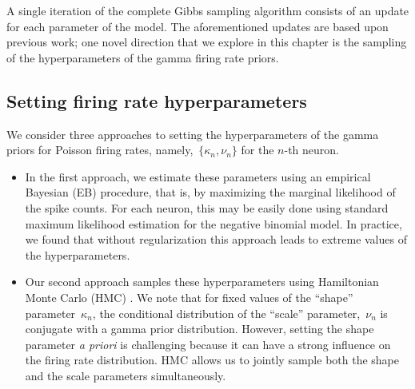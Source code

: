 A single iteration of the complete Gibbs sampling algorithm consists
of an update for each parameter of the model. The aforementioned
updates are based upon previous work; one novel direction that we
explore in this chapter is the sampling of the hyperparameters of the
gamma firing rate priors.

\subsection{Setting firing rate hyperparameters} 
\label{sec:fr_hypers}
We consider three approaches to setting the hyperparameters of the
gamma priors for Poisson firing rates, namely,~${\{\kappa_n,
  \nu_n\}}$ for the $n$-th neuron.  

\begin{itemize}

\item In the first approach, we estimate these parameters using an
  empirical Bayesian (EB) procedure, that is, by maximizing the
  marginal likelihood of the spike counts.  For each neuron, this may be
  easily done using standard maximum likelihood estimation for the
  negative binomial model.  In practice, we found that without
  regularization this approach leads to extreme values of the
  hyperparameters.

 

\item Our second approach samples these hyperparameters using
  Hamiltonian Monte Carlo (HMC) \citep{Neal10}. We note that for fixed
  values of the ``shape'' parameter~$\kappa_n$, the conditional
  distribution of the ``scale'' parameter,~$\nu_n$ is conjugate
  with a gamma prior distribution. However, setting the shape
  parameter \textit{a priori} is challenging because it can have a
  strong influence on the firing rate distribution. HMC allows us to
  jointly sample both the shape and the scale parameters
  simultaneously.


\end{itemize}
